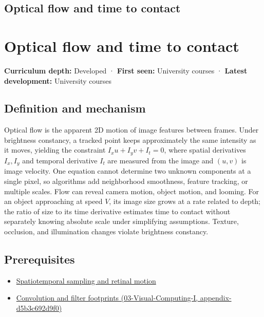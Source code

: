 \hypertarget{appendix-e2e73f8cd93e}{}
\section*{Optical flow and time to contact}
\chapter{Optical flow and time to contact}\label{appendix-e2e73f8cd93e-optical-flow-and-time-to-contact}

\textbf{Curriculum depth:} Developed · \textbf{First seen:} University courses · \textbf{Latest development:} University courses

\section{Definition and mechanism}\label{appendix-e2e73f8cd93e-definition-and-mechanism}

Optical flow is the apparent 2D motion of image features between frames. Under brightness constancy, a tracked point keeps approximately the same intensity as it moves, yielding the constraint \(I_xu+I_yv+I_t=0\), where spatial derivatives \(I_x,I_y\) and temporal derivative \(I_t\) are measured from the image and \((u,v)\) is image velocity. One equation cannot determine two unknown components at a single pixel, so algorithms add neighborhood smoothness, feature tracking, or multiple scales. Flow can reveal camera motion, object motion, and looming. For an object approaching at speed \(V\), its image size grows at a rate related to depth; the ratio of size to its time derivative estimates time to contact without separately knowing absolute scale under simplifying assumptions. Texture, occlusion, and illumination changes violate brightness constancy.

\section{Prerequisites}\label{appendix-e2e73f8cd93e-prerequisites}

\begin{itemize}
\tightlist
\item
  \hyperref[appendix-70895739febb]{Spatiotemporal sampling and retinal motion}
\item
  \href{../03-Visual-Computing-I/main.pdf\#nameddest=appendix-d5b3c692d9f0}{Convolution and filter footprints (03-Visual-Computing-I, appendix-d5b3c692d9f0)}
\end{itemize}

